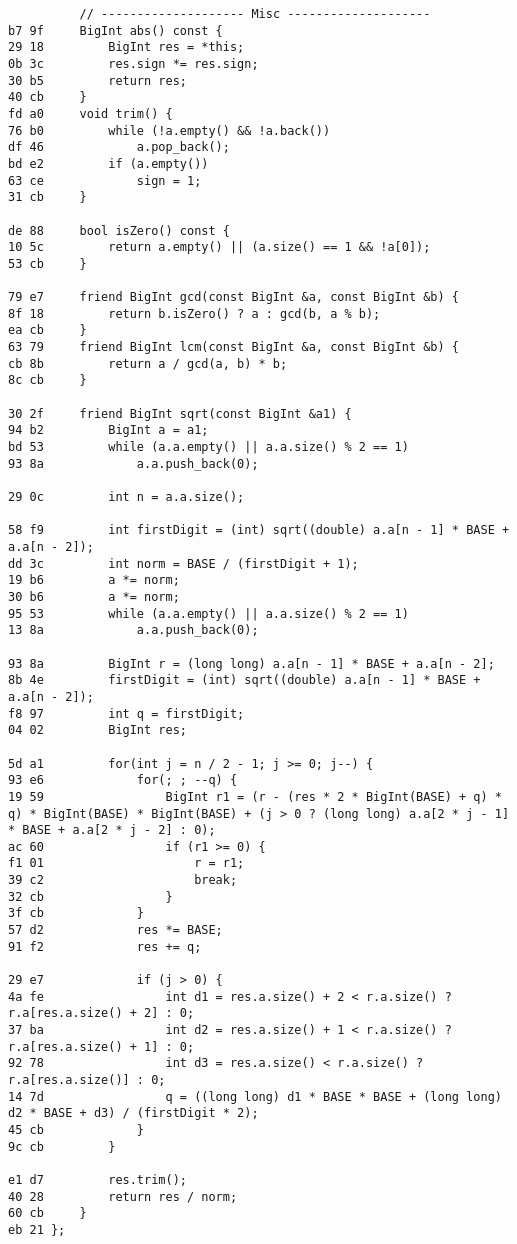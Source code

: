 \documentclass[11pt, a4paper, twoside]{article}
\begin{document}
\begin{lstlisting}
          // -------------------- Misc --------------------
b7 9f     BigInt abs() const {
29 18         BigInt res = *this;
0b 3c         res.sign *= res.sign;
30 b5         return res;
40 cb     }
fd a0     void trim() {
76 b0         while (!a.empty() && !a.back())
df 46             a.pop_back();
bd e2         if (a.empty())
63 ce             sign = 1;
31 cb     }
      
de 88     bool isZero() const {
10 5c         return a.empty() || (a.size() == 1 && !a[0]);
53 cb     }
      
79 e7     friend BigInt gcd(const BigInt &a, const BigInt &b) {
8f 18         return b.isZero() ? a : gcd(b, a % b);
ea cb     }
63 79     friend BigInt lcm(const BigInt &a, const BigInt &b) {
cb 8b         return a / gcd(a, b) * b;
8c cb     }
      
30 2f     friend BigInt sqrt(const BigInt &a1) {
94 b2         BigInt a = a1;
bd 53         while (a.a.empty() || a.a.size() % 2 == 1)
93 8a             a.a.push_back(0);
      
29 0c         int n = a.a.size();
      
58 f9         int firstDigit = (int) sqrt((double) a.a[n - 1] * BASE + a.a[n - 2]);
dd 3c         int norm = BASE / (firstDigit + 1);
19 b6         a *= norm;
30 b6         a *= norm;
95 53         while (a.a.empty() || a.a.size() % 2 == 1)
13 8a             a.a.push_back(0);
      
93 8a         BigInt r = (long long) a.a[n - 1] * BASE + a.a[n - 2];
8b 4e         firstDigit = (int) sqrt((double) a.a[n - 1] * BASE + a.a[n - 2]);
f8 97         int q = firstDigit;
04 02         BigInt res;
      
5d a1         for(int j = n / 2 - 1; j >= 0; j--) {
93 e6             for(; ; --q) {
19 59                 BigInt r1 = (r - (res * 2 * BigInt(BASE) + q) * q) * BigInt(BASE) * BigInt(BASE) + (j > 0 ? (long long) a.a[2 * j - 1] * BASE + a.a[2 * j - 2] : 0);
ac 60                 if (r1 >= 0) {
f1 01                     r = r1;
39 c2                     break;
32 cb                 }
3f cb             }
57 d2             res *= BASE;
91 f2             res += q;
      
29 e7             if (j > 0) {
4a fe                 int d1 = res.a.size() + 2 < r.a.size() ? r.a[res.a.size() + 2] : 0;
37 ba                 int d2 = res.a.size() + 1 < r.a.size() ? r.a[res.a.size() + 1] : 0;
92 78                 int d3 = res.a.size() < r.a.size() ? r.a[res.a.size()] : 0;
14 7d                 q = ((long long) d1 * BASE * BASE + (long long) d2 * BASE + d3) / (firstDigit * 2);
45 cb             }
9c cb         }
      
e1 d7         res.trim();
40 28         return res / norm;
60 cb     }
eb 21 };
\end{lstlisting}
\end{document}
